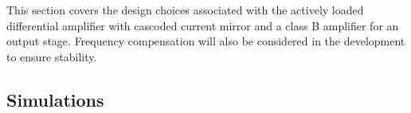 


This section covers the design choices associated with the actively loaded differential amplifier with cascoded current mirror and a class B amplifier for an output stage. Frequency compensation will also be considered in the development to ensure stability.

\subsection{Simulations}




